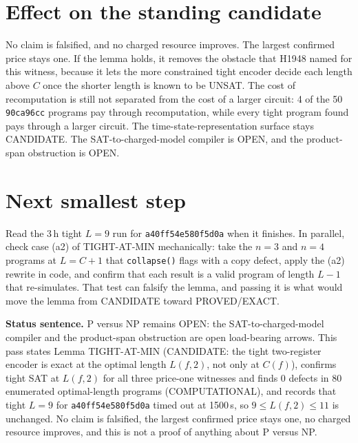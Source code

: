 \documentclass[11pt]{article}
\begin{document}
\section*{Effect on the standing candidate}
No claim is falsified, and no charged resource improves. The largest confirmed price stays one. If the lemma holds, it removes the obstacle that H1948 named for this witness, because it lets the more constrained tight encoder decide each length above $C$ once the shorter length is known to be UNSAT. The cost of recomputation is still not separated from the cost of a larger circuit: 4 of the 50 \texttt{90ca96cc} programs pay through recomputation, while every tight program found pays through a larger circuit. The time-state-representation surface stays CANDIDATE. The SAT-to-charged-model compiler is OPEN, and the product-span obstruction is OPEN.

\section*{Next smallest step}
Read the 3\,h tight $L=9$ run for \texttt{a40ff54e580f5d0a} when it finishes. In parallel, check case (a2) of TIGHT-AT-MIN mechanically: take the $n=3$ and $n=4$ programs at $L=C+1$ that \texttt{collapse()} flags with a copy defect, apply the (a2) rewrite in code, and confirm that each result is a valid program of length $L-1$ that re-simulates. That test can falsify the lemma, and passing it is what would move the lemma from CANDIDATE toward PROVED/EXACT.

\bigskip
\noindent\textbf{Status sentence.} P versus NP remains OPEN: the SAT-to-charged-model compiler and the product-span obstruction are open load-bearing arrows. This pass states Lemma TIGHT-AT-MIN (CANDIDATE: the tight two-register encoder is exact at the optimal length $L(f,2)$, not only at $C(f)$), confirms tight SAT at $L(f,2)$ for all three price-one witnesses and finds 0 defects in 80 enumerated optimal-length programs (COMPUTATIONAL), and records that tight $L=9$ for \texttt{a40ff54e580f5d0a} timed out at 1500\,s, so $9\le L(f,2)\le 11$ is unchanged. No claim is falsified, the largest confirmed price stays one, no charged resource improves, and this is not a proof of anything about P versus NP.
\end{document}
